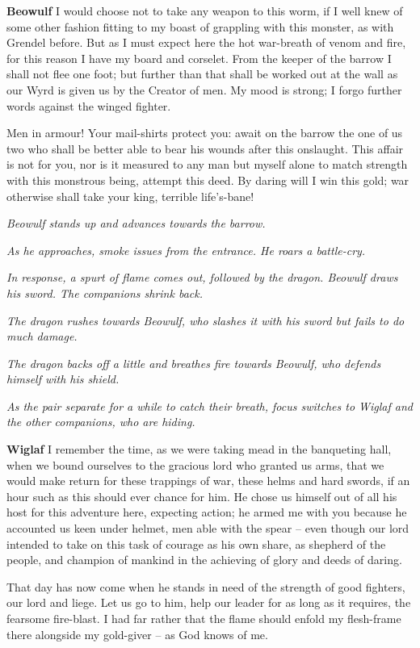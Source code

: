 \documentclass[a4paper]{article}
\begin{document}
{\textbf{Beowulf} I would choose not to take
any weapon to this worm, if I well knew
of some other fashion fitting to my boast
of grappling with this monster, as with Grendel before.
But as I must expect here the hot war-breath
of venom and fire, for this reason I have
my board and corselet. From the keeper of the barrow
I shall not flee one foot; but further than that
shall be worked out at the wall as our Wyrd is given us
by the Creator of men. My mood is strong;
I forgo further words against the winged fighter.

Men in armour! Your mail-shirts protect you:
await on the barrow the one of us two
who shall be better able to bear his wounds
after this onslaught. This affair is not for you,
nor is it measured to any man but myself alone
to match strength with this monstrous being,
attempt this deed. By daring will I
win this gold; war otherwise
shall take your king, terrible life’s-bane!

\centerline{\textit{Beowulf stands up and advances towards the barrow.}}
\centerline{\textit{As he approaches, smoke issues from the entrance. He roars a battle-cry.}}
\centerline{\textit{In response, a spurt of flame comes out, followed by the dragon. Beowulf draws his sword. The companions shrink back.}}

\centerline{\textit{The dragon rushes towards Beowulf, who slashes it with his sword but fails to do much damage.}}
\centerline{\textit{The dragon backs off a little and breathes fire towards Beowulf, who defends himself with his shield.}}
\centerline{\textit{As the pair separate for a while to catch their breath, focus switches to Wiglaf and the other companions, who are hiding.}}

\textbf{Wiglaf} I remember the time, as we were taking mead
in the banqueting hall, when we bound ourselves
to the gracious lord who granted us arms,
that we would make return for these trappings of war,
these helms and hard swords, if an hour such as this
should ever chance for him. He chose us himself
out of all his host for this adventure here,
expecting action; he armed me with you
because he accounted us keen under helmet,
men able with the spear – even though our lord
intended to take on this task of courage
as his own share, as shepherd of the people,
and champion of mankind in the achieving of glory
and deeds of daring.

That day has now come
when he stands in need of the strength of good fighters,
our lord and liege. Let us go to him,
help our leader for as long as it requires,
the fearsome fire-blast. I had far rather
that the flame should enfold my flesh-frame there
alongside my gold-giver – as God knows of me.

}
\end{document}
